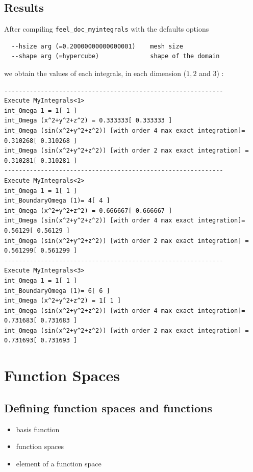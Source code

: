 \subsection{Results}

After compiling \lstinline!feel_doc_myintegrals! with the defaults options
\begin{lstlisting}
  --hsize arg (=0.20000000000000001)    mesh size
  --shape arg (=hypercube)              shape of the domain
\end{lstlisting}

we obtain the values of each integrals, in each dimension ($1,2$ and $3$) : \\
\begin{lstlisting}
------------------------------------------------------------
Execute MyIntegrals<1>
int_Omega 1 = 1[ 1 ]
int_Omega (x^2+y^2+z^2) = 0.333333[ 0.333333 ]
int_Omega (sin(x^2+y^2+z^2)) [with order 4 max exact integration]= 0.310268[ 0.310268 ]
int_Omega (sin(x^2+y^2+z^2)) [with order 2 max exact integration] = 0.310281[ 0.310281 ]
------------------------------------------------------------
Execute MyIntegrals<2>
int_Omega 1 = 1[ 1 ]
int_BoundaryOmega (1)= 4[ 4 ]
int_Omega (x^2+y^2+z^2) = 0.666667[ 0.666667 ]
int_Omega (sin(x^2+y^2+z^2)) [with order 4 max exact integration]= 0.56129[ 0.56129 ]
int_Omega (sin(x^2+y^2+z^2)) [with order 2 max exact integration] = 0.561299[ 0.561299 ]
------------------------------------------------------------
Execute MyIntegrals<3>
int_Omega 1 = 1[ 1 ]
int_BoundaryOmega (1)= 6[ 6 ]
int_Omega (x^2+y^2+z^2) = 1[ 1 ]
int_Omega (sin(x^2+y^2+z^2)) [with order 4 max exact integration]= 0.731683[ 0.731683 ]
int_Omega (sin(x^2+y^2+z^2)) [with order 2 max exact integration] = 0.731693[ 0.731693 ]
\end{lstlisting}



\section{Function Spaces}
\label{sec:function-spaces}

\subsection{Defining function spaces and functions}

\begin{itemize}
\item basis function
\item function spaces
\item element of a function space
\end{itemize}

